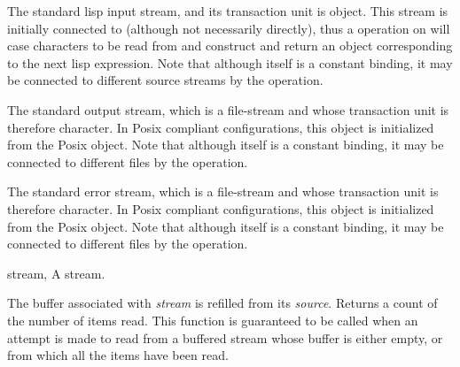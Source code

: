 \begin{optDefinition}
\remarks%
The standard lisp input stream, and its transaction unit is object. This stream
is initially connected to  (although not necessarily
directly), thus a  operation on  will case
characters to be read from  and construct and return an
object corresponding to the next lisp expression. Note that although
 itself is a constant binding, it may be connected to
different source streams by the  operation.

\remarks%
The standard output stream, which is a file-stream and whose transaction unit is
therefore character. In Posix compliant configurations, this object is
initialized from the Posix  object. Note that although
 itself is a constant binding, it may be connected to
different files by the  operation.

\remarks%
The standard error stream, which is a file-stream and whose transaction unit is
therefore character. In Posix compliant configurations, this object is
initialized from the Posix  object. Note that although
 itself is a constant binding, it may be connected to
different files by the  operation.

\label{Buffer-management}

\begin{genericargs}
    \item[stream, \classref{buffered-stream}] A stream.
\end{genericargs}
%
\result%
The buffer associated with {\em stream\/} is refilled from its {\em source\/}.
Returns a count of the number of items read.
%
\remarks%
This function is guaranteed to be called when an attempt is made to read from a
buffered stream whose buffer is either empty, or from which all the items have
been read.


\end{optDefinition}
